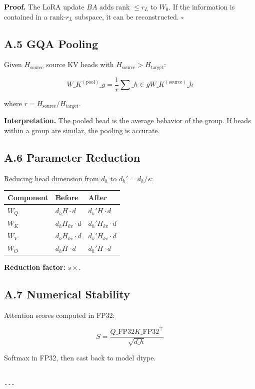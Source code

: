 \textbf{Proof.} The LoRA update $B A$ adds rank $\leq r_L$ to $W_0$. If the 
information is contained in a rank-$r_L$ subspace, it can be reconstructed. 
$\square$

\subsection{A.5 GQA Pooling}

Given $H_\text{source}$ source KV heads with $H_\text{source} > H_\text{target}$:

\[
{W\_K^{(\text{pool})}}\_g = \frac{1}{r} \sum\_{h \in g} {W\_K^{(\text{source})}}\_h
\]

where $r = H_\text{source} / H_\text{target}$.

\textbf{Interpretation.} The pooled head is the average behavior of the group. 
If heads within a group are similar, the pooling is accurate.

\subsection{A.6 Parameter Reduction}

Reducing head dimension from $d_h$ to $d_h' = d_h / s$:

\begin{table}[H]
\centering
\small
\begin{tabular}{lll}
\toprule
\textbf{Component} & \textbf{Before} & \textbf{After} \\
\midrule
$W_Q$ & $d_h H \cdot d$ & $d_h' H \cdot d$ \\
$W_K$ & $d_h H_{kv} \cdot d$ & $d_h' H_{kv} \cdot d$ \\
$W_V$ & $d_h H_{kv} \cdot d$ & $d_h' H_{kv} \cdot d$ \\
$W_O$ & $d_h H \cdot d$ & $d_h' H \cdot d$ \\
\bottomrule
\end{tabular}
\end{table}

\textbf{Reduction factor:} $s\times$.

\subsection{A.7 Numerical Stability}

Attention scores computed in FP32:

\[
S = \frac{Q\_\text{FP32} K\_\text{FP32}^\top}{\sqrt{d\_h}}
\]

Softmax in FP32, then cast back to model dtype.
\begin{lstlisting}

---
\end{lstlisting}